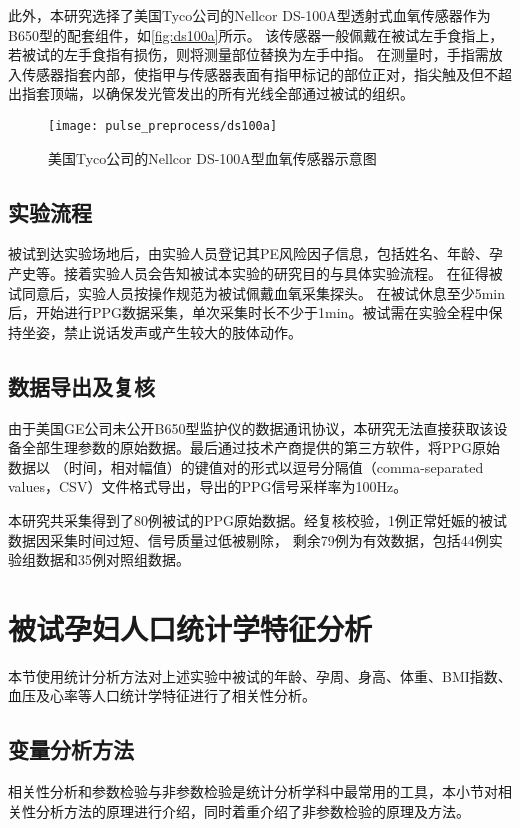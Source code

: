 此外，本研究选择了美国Tyco公司的Nellcor DS-100A型透射式血氧传感器作为B650型的配套组件，如\autoref{fig:ds100a}所示。
该传感器一般佩戴在被试左手食指上，若被试的左手食指有损伤，则将测量部位替换为左手中指。
在测量时，手指需放入传感器指套内部，使指甲与传感器表面有指甲标记的部位正对，指尖触及但不超出指套顶端，以确保发光管发出的所有光线全部通过被试的组织。

\begin{figure}[htbp]
    \centering
    \texttt{[image: pulse\_preprocess/ds100a]}
    \caption{\label{fig:ds100a}美国Tyco公司的Nellcor DS-100A型血氧传感器示意图}
\end{figure}

\subsection{实验流程}
被试到达实验场地后，由实验人员登记其PE风险因子信息，包括姓名、年龄、孕产史等。接着实验人员会告知被试本实验的研究目的与具体实验流程。
在征得被试同意后，实验人员按操作规范为被试佩戴血氧采集探头。
在被试休息至少5min后，开始进行PPG数据采集，单次采集时长不少于1min。被试需在实验全程中保持坐姿，禁止说话发声或产生较大的肢体动作。

\subsection{数据导出及复核}
由于美国GE公司未公开B650型监护仪的数据通讯协议，本研究无法直接获取该设备全部生理参数的原始数据。最后通过技术产商提供的第三方软件，将PPG原始数据以
（时间，相对幅值）的键值对的形式以逗号分隔值（comma-separated values，CSV）文件格式导出，导出的PPG信号采样率为100Hz。

本研究共采集得到了80例被试的PPG原始数据。经复核校验，1例正常妊娠的被试数据因采集时间过短、信号质量过低被剔除，
剩余79例为有效数据，包括44例实验组数据和35例对照组数据。

\section{被试孕妇人口统计学特征分析}
本节使用统计分析方法对上述实验中被试的年龄、孕周、身高、体重、BMI指数、血压及心率等人口统计学特征进行了相关性分析。

\subsection{变量分析方法}
相关性分析和参数检验与非参数检验是统计分析学科中最常用的工具，本小节对相关性分析方法的原理进行介绍，同时着重介绍了非参数检验的原理及方法。


